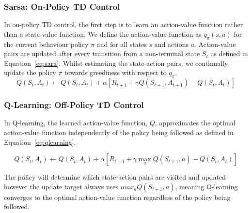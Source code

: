 \subsubsection{Sarsa: On-Policy TD Control}
In on-policy TD control, the first step is to learn an action-value function rather than a state-value function. We define the action-value function as $q_{\pi}(s, a)$ for the current behaviour policy $\pi$ and for all states $s$ and actions $a$. Action-value pairs are updated after every transition from a non-terminal state $S_t$ as defined in Equation~\ref{eq:sara}. Whilst estimating the state-action pairs, we continually update the policy $\pi$ towards greediness with respect to $q_\pi$. \cite{sutton2018reinforcement}
\begin{equation}
    \label{eq:sara}
    Q(S_t, A_t) \leftarrow Q(S_t, A_t) + \alpha \left[ R_{t+1} + \gamma Q(S_{t+1}, A_{t+1}) - Q(S_t, A_t) \right]
\end{equation}

\subsubsection{Q-Learning: Off-Policy TD Control}
In Q-learning, the learned action-value function, $Q$, approximates the optimal action-value function independently of the policy being followed as defined in Equation~\ref{eq:qlearning}. \cite{sutton2018reinforcement}

\begin{equation}
    \label{eq:qlearning}
    Q(S_t, A_t) \leftarrow Q(S_t, A_t) + \alpha \left[ R_{t+1} + \gamma \max_{a} Q(S_{t+1}, a) - Q(S_t, A_t) \right]
\end{equation}

The policy will determine which state-action pairs are visited and updated however the update target always uses $max_{a} Q(S_{t+1}, a)$, meaning Q-learning converges to the optimal action-value function regardless of the policy being followed. \cite{sutton2018reinforcement}

